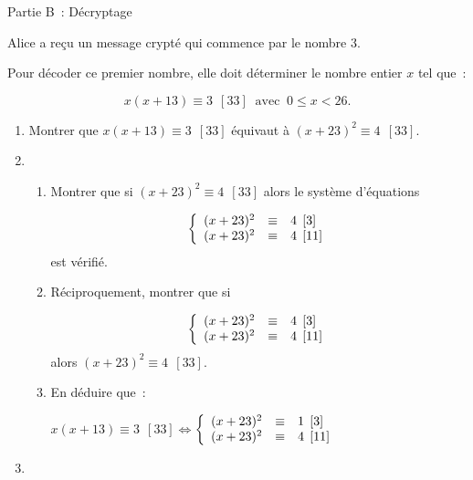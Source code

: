 \begin{center}\begin{h3}Partie B~: Décryptage \end{h3}\end{center}
Alice a reçu un message crypté qui commence par le nombre 3.
\par
Pour décoder ce premier nombre, elle doit déterminer le nombre entier $x$ tel que~:
\par
\[x(x + 13) \equiv  3 \:\: [33]\:  \text{ avec }\: 0 \leqslant  x < 26.\]
\medskip
\begin{enumerate}
     \item Montrer que $x(x + 13) \equiv 3\:\: [33]$ équivaut à $(x + 23)^2 \equiv 4\:\: [33].$
     \smallskip
     \item
     \begin{enumerate}[label=\alph*.]
          \item Montrer que si $(x + 23)^2 \equiv 4\:\: [33]$ alors le système d'équations
          \par
          \[\left\{\begin{array}{l c l}
                    (x + 23)^2 &\equiv &4 \:\: [3]\\
                    (x + 23)^2 &\equiv &4 \:\: [11]
          \end{array}\right.\]
          est vérifié.
          \item Réciproquement, montrer que si
          \par
          \[\left\{\begin{array}{l c l}
                    (x + 23)^2 &\equiv &4\:\: [3]\\
                    (x + 23)^2 &\equiv &4 \:\: [11]
          \end{array}\right.\]
          alors $(x + 23)^2 \equiv 4\:\: [33].$
          \item En déduire que~:
          \begin{center}
               $x(x + 13) \equiv 3\:\: [33] \Leftrightarrow $\nosp$ \left\{\begin{array}{l c l}
                         (x + 23)^2 &\equiv&1 \:\: [3]\\
                         (x + 23)^2 &\equiv& 4 \:\: [11]
               \end{array}\right.$
          \end{center}
     \end{enumerate}
     \item
     \begin{enumerate}[label=\alph*.]

\end{enumerate}
\end{enumerate}
